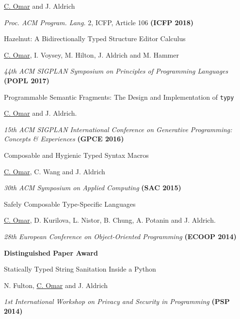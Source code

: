 \documentclass[10pt,letterpaper]{article}
\renewenvironment{itemize}{
  \begin{list}{}{
    \setlength{\leftmargin}{1.25em}
    \setlength{\itemsep}{0.25em}
    \setlength{\parskip}{0pt}
    \setlength{\parsep}{0.2em}
  }
}{
  \end{list}
}
\begin{document}
\begin{enumerate}
\begin{itemize}
    \item \underline{C. Omar} and J. Aldrich
    \item \textit{Proc. ACM Program. Lang.} 2, ICFP, Article 106 \textbf{(ICFP 2018)}
  \end{itemize}
\item {Hazelnut: A Bidirectionally Typed Structure Editor Calculus}
  \begin{itemize}
    \item \underline{C. Omar}, I. Voysey, M. Hilton, J. Aldrich and M. Hammer
    \item \textit{44th ACM SIGPLAN Symposium on Principles of Programming Languages} {\textbf{(POPL 2017)}}
  \end{itemize}
\item {Programmable Semantic Fragments: The Design and Implementation of \texttt{typy}}
  \begin{itemize}
    \item \underline{C. Omar} and J. Aldrich.
    \item \textit{15th ACM SIGPLAN International Conference on Generative Programming: Concepts \& Experiences} {\textbf{(GPCE 2016)}}
  \end{itemize}
\item Composable and Hygienic Typed Syntax Macros
  \begin{itemize}
    \item \underline{C. Omar}, C. Wang and J. Aldrich
    \item \textit{30th ACM Symposium on Applied Computing} {\textbf{(SAC 2015)}}
  \end{itemize}
\item {Safely Composable Type-Specific Languages}
  \begin{itemize}
    \item \underline{C. Omar}, D. Kurilova, L. Nistor, B. Chung, A. Potanin and J. Aldrich.
    \item \textit{28th European Conference on Object-Oriented Programming} {\textbf{(ECOOP 2014)}}
    \item \textbf{Distinguished Paper Award}
  \end{itemize}
\item Statically Typed String Sanitation Inside a Python
  \begin{itemize}
    \item N. Fulton, \underline{C. Omar} and J. Aldrich
    \item \textit{1st International Workshop on Privacy and Security in Programming} {\textbf{(PSP 2014)}}

\end{itemize}
\end{enumerate}
\end{document}
